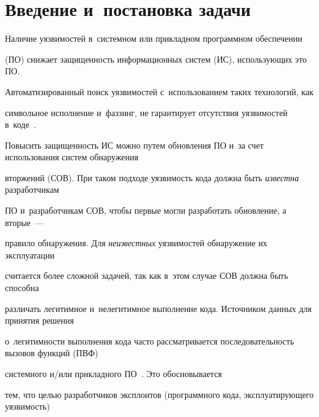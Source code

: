








 \thispagestyle{headings}

 






\section{Введение и~постановка задачи}



Наличие уязвимостей в~системном или прикладном программном обеспечении 

(ПО) снижает защищенность информационных систем (ИС), использующих это ПО. 

Автоматизированный поиск уязвимостей с~использованием таких технологий, как 

символьное исполнение и~фаззинг, не гарантирует отсутствия уязвимостей в~коде~\cite{Roh2011}. 

Повысить защищенность ИС можно путем обновления ПО и~за счет использования систем обнаружения 

вторжений (СОВ). При таком подходе уязвимость кода должна быть \textit{известна} разработчикам 

ПО и~разработчикам СОВ, чтобы первые могли разработать обновление, а вторые~--- 

правило обнаружения. Для \textit{неизвестных} уязвимостей обнаружение их эксплуатации 

считается более сложной задачей, так как в~этом случае СОВ должна быть способна 

различать легитимное и~нелегитимное выполнение кода. Источником данных для принятия решения 

о~легитимности выполнения кода часто рассматривается последовательность вызовов функций (ПВФ) 

системного и\!/\!или прикладного ПО~\cite{Forrest2008,Gupta2018,Singh2017}. Это обосновывается 

тем, что целью разработчиков эксплоитов (программного кода, эксплуатирующего уязвимость) 

